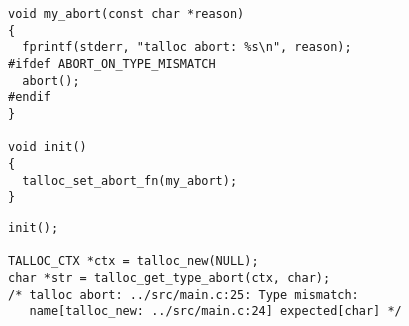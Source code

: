 \begin{lstlisting}[caption={Custom abort function}]
void my_abort(const char *reason)
{
  fprintf(stderr, "talloc abort: %s\n", reason);
#ifdef ABORT_ON_TYPE_MISMATCH
  abort();
#endif
}

void init()
{
  talloc_set_abort_fn(my_abort);
}
\end{lstlisting}

\begin{lstlisting}[caption={Sample output}]
init();

TALLOC_CTX *ctx = talloc_new(NULL);
char *str = talloc_get_type_abort(ctx, char);
/* talloc abort: ../src/main.c:25: Type mismatch: 
   name[talloc_new: ../src/main.c:24] expected[char] */
\end{lstlisting}

%
